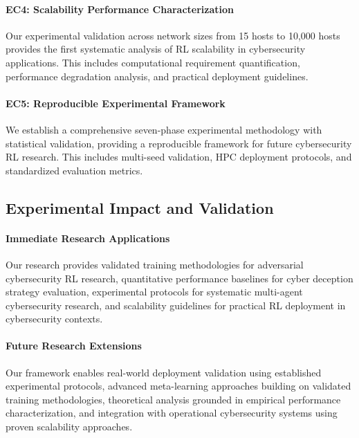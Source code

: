 \documentclass[12pt,oneside]{article}
\begin{document}
\paragraph{EC4: Scalability Performance Characterization}
Our experimental validation across network sizes from 15 hosts to 10,000 hosts provides the first systematic analysis of RL scalability in cybersecurity applications. This includes computational requirement quantification, performance degradation analysis, and practical deployment guidelines.

\paragraph{EC5: Reproducible Experimental Framework}
We establish a comprehensive seven-phase experimental methodology with statistical validation, providing a reproducible framework for future cybersecurity RL research. This includes multi-seed validation, HPC deployment protocols, and standardized evaluation metrics.

\subsection{Experimental Impact and Validation}

\paragraph{Immediate Research Applications} Our research provides validated training methodologies for adversarial cybersecurity RL research, quantitative performance baselines for cyber deception strategy evaluation, experimental protocols for systematic multi-agent cybersecurity research, and scalability guidelines for practical RL deployment in cybersecurity contexts.

\paragraph{Future Research Extensions} Our framework enables real-world deployment validation using established experimental protocols, advanced meta-learning approaches building on validated training methodologies, theoretical analysis grounded in empirical performance characterization, and integration with operational cybersecurity systems using proven scalability approaches.



\clearpage
\end{document}
